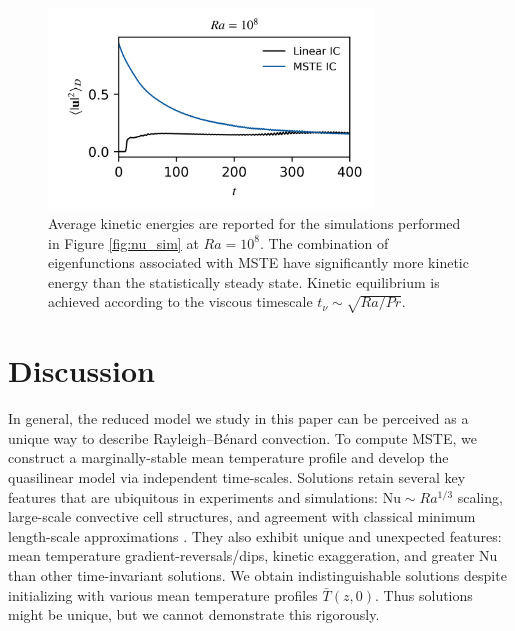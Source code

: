 \documentclass[reprint,amsmath,amssymb,aps]{revtex4-1}
\newcommand\Nu{\mathrm{Nu}}
\begin{document}
\begin{figure}
    \begin{minipage}{3.4in}
        \centering
        \includegraphics[width=3.4in]{sim_eq_ke.png}
        \caption{Average kinetic energies are reported for the simulations performed in Figure \ref{fig:nu_sim} at $Ra = 10^8$. 
        The combination of eigenfunctions associated with MSTE have significantly more kinetic energy than the statistically steady state. 
        Kinetic equilibrium is achieved according to the viscous timescale $t_{\nu} \sim \sqrt{Ra / Pr}$.}
        \label{fig:ke_sim}
    \end{minipage}
\end{figure}

\section{Discussion}\label{sec:Discussion}
In general, the reduced model we study in this paper can be perceived as a unique way to describe Rayleigh–Bénard convection. 
To compute MSTE, we construct a marginally-stable mean temperature profile and develop the quasilinear model via independent time-scales.
Solutions retain several key features that are ubiquitous in experiments and simulations: $\Nu \sim Ra^{1/3}$ scaling, large-scale convective cell structures, and agreement with classical minimum length-scale approximations \cite{Malkus_1954}. 
They also exhibit unique and unexpected features: mean temperature gradient-reversals/dips, kinetic exaggeration, and greater $\Nu$ than other time-invariant solutions. 
We obtain indistinguishable solutions despite initializing with various mean temperature profiles $\bar{T}(z, 0)$. 
Thus solutions might be unique, but we cannot demonstrate this rigorously.

\end{document}
